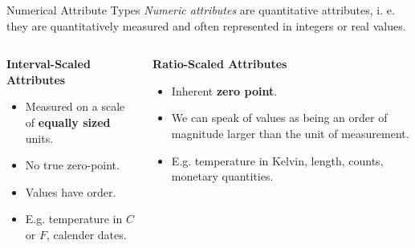 \begin{frame}{Numerical Attribute Types}
  \textit{Numeric attributes} are quantitative attributes, i. e. they are
  quantitatively measured and often represented in integers or real
  values.\\\medskip

  \begin{columns}[t]
    \begin{column}{0.5\columnwidth}
      \centering \textbf{Interval-Scaled Attributes}
      \begin{itemize}
      \item Measured on a scale of \textbf{equally sized} units.
      \item No true zero-point.
      \item Values have order.
        \item E.g. temperature in $C$ or $F$, calender dates.
      \end{itemize}
    \end{column}
    \begin{column}{0.5\columnwidth}
      \centering \textbf{Ratio-Scaled Attributes}
      \begin{itemize}
      \item Inherent \textbf{zero point}.
      \item We can speak of values as being an order of magnitude larger
        than the unit of measurement.
       \item E.g. temperature in Kelvin, length, counts, monetary quantities.
      \end{itemize}
    \end{column}
  \end{columns}

  \vspace{0.1em}
\end{frame}
